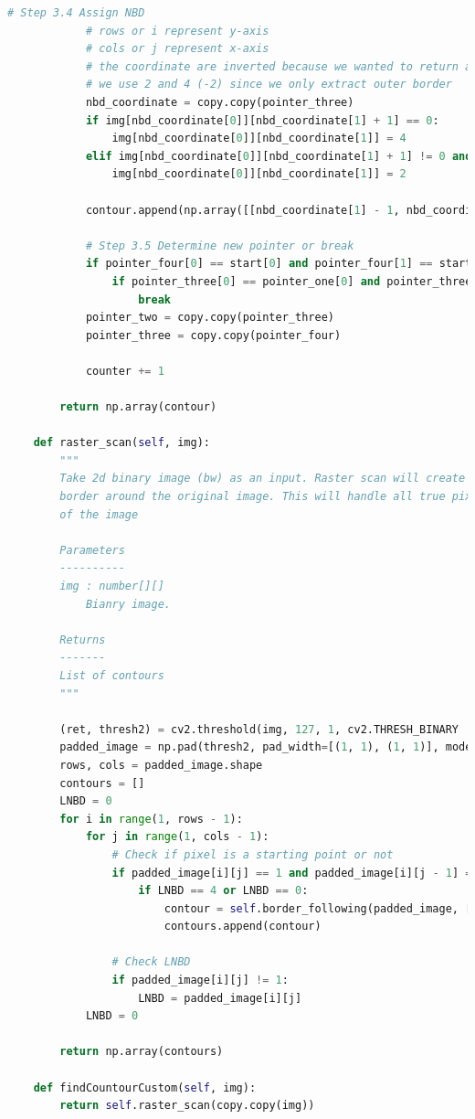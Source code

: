 \begin{lstlisting}[language=Python,basicstyle=\tiny]
            # Step 3.4 Assign NBD
            # rows or i represent y-axis
            # cols or j represent x-axis
            # the coordinate are inverted because we wanted to return a set of (x, y) points, not (y, x)
            # we use 2 and 4 (-2) since we only extract outer border
            nbd_coordinate = copy.copy(pointer_three)
            if img[nbd_coordinate[0]][nbd_coordinate[1] + 1] == 0:
                img[nbd_coordinate[0]][nbd_coordinate[1]] = 4
            elif img[nbd_coordinate[0]][nbd_coordinate[1] + 1] != 0 and img[nbd_coordinate[0]][nbd_coordinate[1]] == 1:
                img[nbd_coordinate[0]][nbd_coordinate[1]] = 2

            contour.append(np.array([[nbd_coordinate[1] - 1, nbd_coordinate[0] - 1]]))

            # Step 3.5 Determine new pointer or break
            if pointer_four[0] == start[0] and pointer_four[1] == start[1]:
                if pointer_three[0] == pointer_one[0] and pointer_three[1] == pointer_one[1]:
                    break
            pointer_two = copy.copy(pointer_three)
            pointer_three = copy.copy(pointer_four)

            counter += 1

        return np.array(contour)

    def raster_scan(self, img):
        """
        Take 2d binary image (bw) as an input. Raster scan will create an additional 0 padded
        border around the original image. This will handle all true pixel (255) that sit at the edge
        of the image

        Parameters
        ----------
        img : number[][]
            Bianry image.

        Returns
        -------
        List of contours
        """

        (ret, thresh2) = cv2.threshold(img, 127, 1, cv2.THRESH_BINARY | cv2.THRESH_OTSU)
        padded_image = np.pad(thresh2, pad_width=[(1, 1), (1, 1)], mode="constant")
        rows, cols = padded_image.shape
        contours = []
        LNBD = 0
        for i in range(1, rows - 1):
            for j in range(1, cols - 1):
                # Check if pixel is a starting point or not
                if padded_image[i][j] == 1 and padded_image[i][j - 1] == 0:
                    if LNBD == 4 or LNBD == 0:
                        contour = self.border_following(padded_image, [i, j], [i, j - 1])
                        contours.append(contour)

                # Check LNBD
                if padded_image[i][j] != 1:
                    LNBD = padded_image[i][j]
            LNBD = 0

        return np.array(contours)

    def findCountourCustom(self, img):
        return self.raster_scan(copy.copy(img))
\end{lstlisting}

